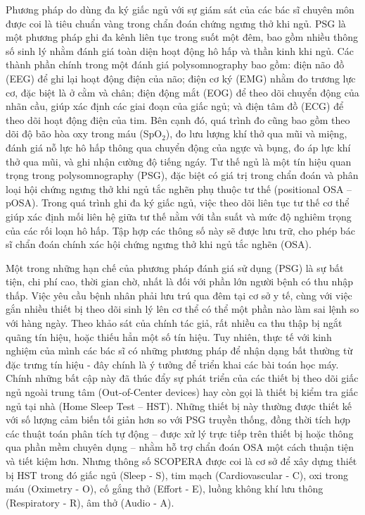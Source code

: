Phương pháp do dùng đa ký giấc ngủ với sự giám sát của các bác sĩ chuyên môn
được coi là tiêu chuẩn vàng trong chẩn đoán chứng ngưng thở khi ngủ. PSG là một
phương pháp ghi đa kênh liên tục trong suốt một đêm, bao gồm nhiều thông số
sinh lý nhằm đánh giá toàn diện hoạt động hô hấp và thần kinh khi ngủ. Các
thành phần chính trong một đánh giá polysomnography bao gồm: điện não đồ (EEG)
để ghi lại hoạt động điện của não; điện cơ ký (EMG) nhằm đo trương lực cơ, đặc
biệt là ở cằm và chân; điện động mắt (EOG) để theo dõi chuyển động của nhãn
cầu, giúp xác định các giai đoạn của giấc ngủ; và điện tâm đồ (ECG) để theo dõi
hoạt động điện của tim. Bên cạnh đó, quá trình đo cũng bao gồm theo dõi độ bão
hòa oxy trong máu (SpO$_2$), đo lưu lượng khí thở qua mũi và miệng, đánh giá nỗ
lực hô hấp thông qua chuyển động của ngực và bụng, đo áp lực khí thở qua mũi,
và ghi nhận cường độ tiếng ngáy. Tư thế ngủ là một tín hiệu quan trọng trong
polysomnography (PSG), đặc biệt có giá trị trong chẩn đoán và phân loại hội
chứng ngưng thở khi ngủ tắc nghẽn phụ thuộc tư thế (positional OSA – pOSA).
Trong quá trình ghi đa ký giấc ngủ, việc theo dõi liên tục tư thế cơ thể giúp
xác định mối liên hệ giữa tư thế nằm với tần suất và mức độ nghiêm trọng của
các rối loạn hô hấp. Tập hợp các thông số này sẽ được lưu trữ, cho phép bác sĩ
chẩn đoán chính xác hội chứng ngưng thở khi ngủ tắc nghẽn (OSA).

Một trong những hạn chế của phương pháp đánh giá sử dụng (\gls{PSG}) là sự bất
tiện, chi phí cao, thời gian chờ, nhất là đối với phần lớn người bệnh có thu
nhập thấp. Việc yêu cầu bệnh nhân phải lưu trú qua đêm tại cơ sở y tế, cùng với
việc gắn nhiều thiết bị theo dõi sinh lý lên cơ thể có thể một phần nào làm sai
lệnh so với hàng ngày. Theo khảo sát của chính tác giả, rất nhiều ca thu thập
bị ngắt quãng tín hiệu, hoặc thiếu hẳn một số tín hiệu. Tuy nhiên, thực tế với
kinh nghiệm của mình các bác sĩ có những phương pháp để nhận dạng bất thường từ
đặc trưng tín hiệu - đây chính là ý tưởng để triển khai các bài toán học máy.
Chính những bất cập này đã thúc đẩy sự phát triển của các thiết bị theo dõi
giấc ngủ ngoài trung tâm (Out-of-Center devices) hay còn gọi là thiết bị kiểm
tra giấc ngủ tại nhà (Home Sleep Test – HST). Những thiết bị này thường được
thiết kế với số lượng cảm biến tối giản hơn so với PSG truyền thống, đồng thời
tích hợp các thuật toán phân tích tự động – được xử lý trực tiếp trên thiết bị
hoặc thông qua phần mềm chuyên dụng – nhằm hỗ trợ chẩn đoán OSA một cách thuận
tiện và tiết kiệm hơn. Nhưng thông số SCOPERA được coi là cơ sở để xây dựng
thiết bị HST trong đó giấc ngủ (Sleep - S), tim mạch (Cardiovascular - C), oxi
trong máu (Oximetry - O), cố gắng thở (Effort - E), luồng không khí lưu thông
(Respiratory - R), âm thở (Audio - A).

